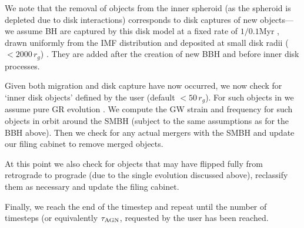 We note that the removal of objects from the inner spheroid (as the spheroid is depleted due to disk interactions) corresponds to disk captures of new objects---we assume BH are captured by this disk model at a fixed rate of $1/0.1$Myr \citep{Secunda+21}, drawn uniformly from the IMF distribution and deposited at small disk radii ($<2000\,r_{g}$)
 \citep{Fabj+20}.
 They are added after the creation of new BBH and before inner disk processes.

Given both migration and disk capture have now occurred, we now check for `inner disk objects' defined by the user (default $<50 \,r_{g}$).
For such objects in  we assume pure GR evolution \cite{Peters64}.
We compute the GW strain and frequency for such objects in orbit around the SMBH (subject to the same assumptions as for the BBH above).
Then we check for any actual mergers with the SMBH and update our filing cabinet to remove merged objects.

At this point we also check for objects that may have flipped fully from retrograde to prograde (due to the single evolution discussed above), reclassify them as necessary and update the filing cabinet.

Finally, we reach the end of the timestep and repeat until the number of timesteps (or equivalently $\tau_{\rm AGN}$, requested by the user has been reached.

